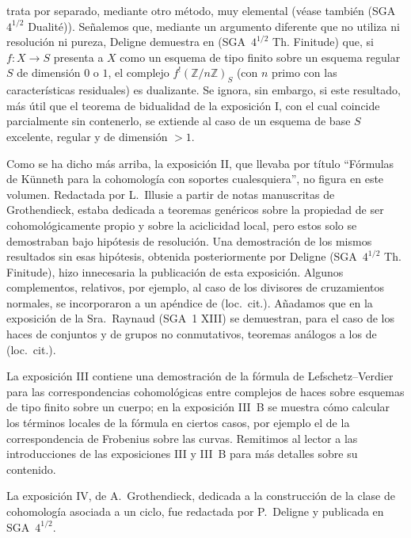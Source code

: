 \clearpage
\noindent trata por separado, mediante otro método, muy elemental (véase también (SGA~$4^{1/2}$ Dualité)). Señalemos que, mediante un argumento diferente que no utiliza ni resolución ni pureza, Deligne demuestra en (SGA~$4^{1/2}$ Th. Finitude) que, si $f:X\longrightarrow S$ presenta a $X$ como un esquema de tipo finito sobre un esquema regular $S$ de dimensión $0$ o $1$, el complejo $f^!(\mathbb Z/n\mathbb Z)_S$ (con $n$ primo con las características residuales) es dualizante. Se ignora, sin embargo, si este resultado, más útil que el teorema de bidualidad de la exposición I, con el cual coincide parcialmente sin contenerlo, se extiende al caso de un esquema de base $S$ excelente, regular y de dimensión $>1$.

Como se ha dicho más arriba, la exposición II, que llevaba por título ``Fórmulas de Künneth para la cohomología con soportes cualesquiera'', no figura en este volumen. Redactada por L.~Illusie a partir de notas manuscritas de Grothendieck, estaba dedicada a teoremas genéricos sobre la propiedad de ser cohomológicamente propio y sobre la aciclicidad local, pero estos solo se demostraban bajo hipótesis de resolución. Una demostración de los mismos resultados sin esas hipótesis, obtenida posteriormente por Deligne (SGA~$4^{1/2}$ Th. Finitude), hizo innecesaria la publicación de esta exposición. Algunos complementos, relativos, por ejemplo, al caso de los divisores de cruzamientos normales, se incorporaron a un apéndice de (loc.~cit.). Añadamos que en la exposición de la Sra.~Raynaud (SGA~1 XIII) se demuestran, para el caso de los haces de conjuntos y de grupos no conmutativos, teoremas análogos a los de (loc.~cit.).

La exposición III contiene una demostración de la fórmula de Lefschetz--Verdier para las correspondencias cohomológicas entre complejos de haces sobre esquemas de tipo finito sobre un cuerpo; en la exposición III~B se muestra cómo calcular los términos locales de la fórmula en ciertos casos, por ejemplo el de la correspondencia de Frobenius sobre las curvas. Remitimos al lector a las introducciones de las exposiciones III y III~B para más detalles sobre su contenido.

La exposición IV, de A.~Grothendieck, dedicada a la construcción de la clase de cohomología asociada a un ciclo, fue redactada por P.~Deligne y publicada en SGA~$4^{1/2}$.
